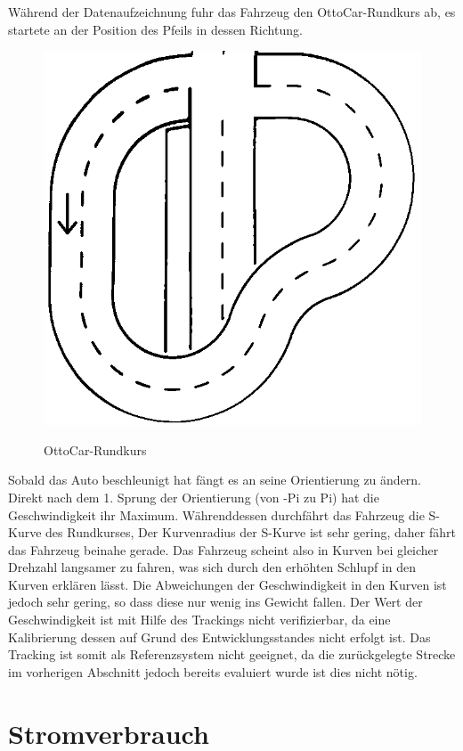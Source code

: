 Während der Datenaufzeichnung fuhr das Fahrzeug den OttoCar-Rund\-kurs ab, es startete  an der Position des Pfeils in dessen Richtung.


\begin{figure}[H]
\centering
\includegraphics[width=.8\textwidth]{Strasse_mono.png}\\
\caption{OttoCar-Rundkurs}%
\label{fig:strasse}
\end{figure}

Sobald das Auto beschleunigt hat fängt es an seine Orientierung zu ändern. Direkt nach dem 1. Sprung der Orientierung (von -Pi zu Pi)
hat die Geschwindigkeit ihr Maximum. Währenddessen durchfährt das Fahrzeug die S-Kurve des Rundkurses, Der Kurvenradius der S-Kurve ist sehr gering, daher fährt das Fahrzeug
beinahe gerade. Das Fahrzeug scheint also in Kurven bei gleicher Drehzahl langsamer zu fahren, was sich durch  den erhöhten Schlupf in den Kurven erklären lässt. Die Abweichungen 
der Geschwindigkeit in den Kurven ist jedoch sehr gering, so dass diese nur wenig ins Gewicht fallen. Der Wert der Geschwindigkeit ist mit Hilfe des Trackings nicht verifizierbar,
da eine Kalibrierung dessen auf Grund des Entwicklungsstandes nicht erfolgt ist. Das Tracking ist somit als Referenzsystem nicht geeignet, da die zurückgelegte Strecke im vorherigen
Abschnitt jedoch bereits evaluiert wurde ist dies nicht nötig.


\section{Stromverbrauch}

